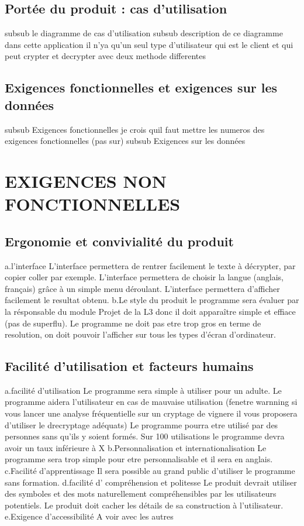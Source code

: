 \documentclass[a4]{article}
\begin{document}
		\subsection{Portée du produit : cas d’utilisation}
			subsub le diagramme de cas d'utilisation
			subsub description de ce diagramme
				dans cette application il n'ya qu'un seul type d'utilisateur qui est le client 
				et qui peut crypter et decrypter avec deux methode differentes
		\subsection{Exigences fonctionnelles et exigences sur les données}
			subsub Exigences fonctionnelles
				je crois quil faut mettre les numeros des exigences fonctionnelles (pas sur)
			subsub Exigences sur les données 
	\section{EXIGENCES NON FONCTIONNELLES}
		\subsection{Ergonomie et convivialité du produit}
a.l'interface
L'interface permettera de rentrer facilement le texte à décrypter, par copier coller par exemple.
L'interface permettera de choisir la langue (anglais, français) grâce à un simple menu déroulant.
L'interface permettera d'afficher facilement le resultat obtenu.
b.Le style du produit
le programme sera évaluer par la résponsable du module Projet de la L3 donc il doit apparaître simple et effiace (pas de superflu).
Le programme ne doit pas etre trop gros en terme de resolution, on doit pouvoir l'afficher sur tous les types d'écran d'ordinateur.

		\subsection{Facilité d’utilisation et facteurs humains}
		a.facilité d'utilisation
Le programme sera simple à utiliser pour un adulte.
Le programme aidera l'utilisateur en cas de mauvaise utilisation (fenetre warnning si vous lancer une analyse fréquentielle sur un cryptage de vignere il vous proposera d'utiliser le drecryptage adéquats)
Le programme pourra etre utilisé par des personnes sans qu'ils y soient formés.
Sur 100 utilisations le programme devra avoir un taux inférieure à X%
b.Personnalisation et internationalisation
Le programme sera trop simple pour etre personnalisable et il sera en anglais.
c.Facilité d'apprentissage
Il sera possible au grand public d’utiliser le programme sans formation.
d.facilité d' compréhension et politesse
Le produit devrait utiliser des symboles et des mots naturellement compréhensibles par les
utilisateurs potentiels.
Le produit doit cacher les détails de sa construction à l’utilisateur.
e.Exigence d'accessibilité
A voir avec les autres
\end{document}
